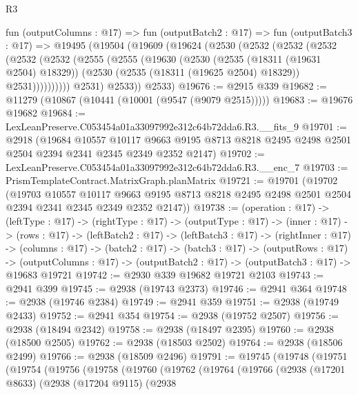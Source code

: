 \begin{lexlean}{R3}
\begin{coremodule}
  fun (outputColumns : @17) =>
  fun (outputBatch2 : @17) =>
  fun (outputBatch3 : @17) =>
  @19495
    (@19504
      (@19609
        (@19624
          (@2530
            (@2532
              (@2532
                (@2532
                  (@2532
                    (@2532
                      (@2555
                        (@2555
                          (@19630
                            (@2530
                              (@2535 (@18311 (@19631 @2504) @18329))
                              (@2530 (@2535 (@18311 (@19625 @2504) @18329)) @2531))))))))))
            @2531)
          @2533))
      @2533)
@19676 := @2915 @339
@19682 := @11279 (@10867 (@10441 (@10001 (@9547 (@9079 @2515)))))
@19683 := @19676 @19682
@19684 := LexLeanPreserve.C053454a01a33097992e312c64b72dda6.R3.__fits_9
@19701 := @2918
    (@19684
      @10557
      @10117
      @9663
      @9195
      @8713
      @8218
      @2495
      @2498
      @2501
      @2504
      @2394
      @2341
      @2345
      @2349
      @2352
      @2147)
@19702 := LexLeanPreserve.C053454a01a33097992e312c64b72dda6.R3.__enc_7
@19703 := PrismTemplateContract.MatrixGraph.planMatrix
@19721 := @19701
    (@19702
      (@19703
        @10557
        @10117
        @9663
        @9195
        @8713
        @8218
        @2495
        @2498
        @2501
        @2504
        @2394
        @2341
        @2345
        @2349
        @2352
        @2147))
@19738 := (operation : @17) ->
  (leftType : @17) ->
  (rightType : @17) ->
  (outputType : @17) ->
  (inner : @17) ->
  (rows : @17) ->
  (leftBatch2 : @17) ->
  (leftBatch3 : @17) ->
  (rightInner : @17) ->
  (columns : @17) ->
  (batch2 : @17) ->
  (batch3 : @17) ->
  (outputRows : @17) ->
  (outputColumns : @17) -> (outputBatch2 : @17) -> (outputBatch3 : @17) -> @19683 @19721
@19742 := @2930 @339 @19682 @19721 @2103
@19743 := @2941 @399
@19745 := @2938 (@19743 @2373)
@19746 := @2941 @364
@19748 := @2938 (@19746 @2384)
@19749 := @2941 @359
@19751 := @2938 (@19749 @2433)
@19752 := @2941 @354
@19754 := @2938 (@19752 @2507)
@19756 := @2938 (@18494 @2342)
@19758 := @2938 (@18497 @2395)
@19760 := @2938 (@18500 @2505)
@19762 := @2938 (@18503 @2502)
@19764 := @2938 (@18506 @2499)
@19766 := @2938 (@18509 @2496)
@19791 := @19745
    (@19748
      (@19751
        (@19754
          (@19756
            (@19758
              (@19760
                (@19762
                  (@19764
                    (@19766
                      (@2938
                        (@17201 @8633)
                        (@2938
                          (@17204 @9115)
                          (@2938

\end{coremodule}
\end{lexlean}
